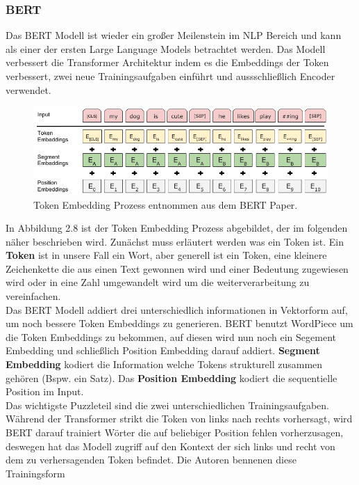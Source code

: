 \documentclass[12pt,letterpaper,ngerman]{article}
\begin{document}
\subsubsection{BERT}
Das BERT Modell ist wieder ein großer Meilenstein im NLP Bereich und
kann als einer der ersten Large Language Models betrachtet werden.
Das Modell verbessert die Transformer Architektur indem es die
Embeddings der Token verbessert, zwei neue Trainingsaufgaben einführt
und aussschließlich Encoder verwendet.
\begin{figure}[H]
  \begin{center}
    \includegraphics[scale=0.5]{abb/BERT-Tokens.png}
  \end{center}
  \caption{Token Embedding Prozess entnommen aus dem BERT Paper.}
\end{figure}
In Abbildung 2.8 ist der Token Embedding Prozess abgebildet, der
im folgenden näher beschrieben wird. Zunächst muss erläutert 
werden was ein  Token ist. Ein {\bf Token} ist in unsere Fall ein Wort,
aber generell ist ein Token, eine kleinere Zeichenkette die aus
einen Text gewonnen wird und einer Bedeutung zugewiesen wird
oder in eine Zahl umgewandelt wird um die weiterverarbeitung
zu vereinfachen.\\
Das BERT Modell addiert drei unterschiedlich informationen
in Vektorform auf, um noch bessere Token Embeddings zu
generieren. BERT benutzt WordPiece %
um die Token Embeddings zu bekommen, auf diesen wird
nun noch ein Segement Embedding und schließlich Position
Embedding darauf addiert. {\bf Segment Embedding} kodiert
die Information welche Tokens strukturell zusammen gehören
(Bspw. ein Satz). Das {\bf Position Embedding} kodiert
die sequentielle Position im Input.\\
Das wichtigste Puzzleteil sind die zwei unterschiedlichen
Trainingsaufgaben. Während der Transformer strikt die
Token von links nach rechts vorhersagt, wird BERT darauf
trainiert Wörter die auf beliebiger Position fehlen 
vorherzusagen, deswegen hat das Modell zugriff auf
den Kontext der sich links und recht von dem zu verhersagenden
Token befindet. Die Autoren bennenen diese Trainingsform
\end{document}
